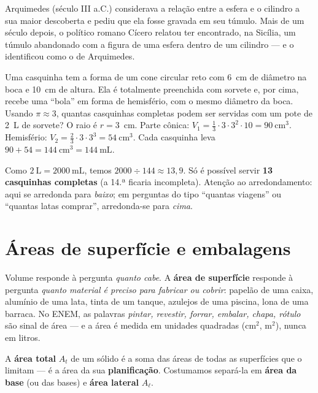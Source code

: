 \begin{contexto}
Arquimedes (século III a.C.) considerava a relação entre a esfera e o cilindro a
sua maior descoberta e pediu que ela fosse gravada em seu túmulo. Mais de um
século depois, o político romano Cícero relatou ter encontrado, na Sicília, um
túmulo abandonado com a figura de uma esfera dentro de um cilindro — e o
identificou como o de Arquimedes.
\end{contexto}

\begin{exemplo}
Uma casquinha tem a forma de um cone circular reto com 6~cm de diâmetro na boca
e 10~cm de altura. Ela é totalmente preenchida com sorvete e, por cima, recebe uma
“bola” em forma de hemisfério, com o mesmo diâmetro da boca. Usando
$\pi\approx 3$, quantas casquinhas completas podem ser servidas com um pote de
2~L de sorvete?
\solucao
O raio é $r = 3$~cm. Parte cônica:
$V_1 = \frac13\cdot 3\cdot 3^2\cdot 10 = 90\ \text{cm}^3$.
Hemisfério: $V_2 = \frac23\cdot 3\cdot 3^3 = 54\ \text{cm}^3$.
Cada casquinha leva $90 + 54 = 144\ \text{cm}^3 = 144\ \text{mL}$.

Como $2\ \text{L} = 2000\ \text{mL}$, temos $2000\div 144 \approx 13{,}9$. Só é
possível servir \textbf{13 casquinhas completas} (a 14.ª ficaria incompleta).
Atenção ao arredondamento: aqui se arredonda para \emph{baixo}; em perguntas do
tipo “quantas viagens” ou “quantas latas comprar”, arredonda-se para \emph{cima}.
\end{exemplo}

\section{Áreas de superfície e embalagens}

Volume responde à pergunta \emph{quanto cabe}. A \textbf{área de superfície}
responde à pergunta \emph{quanto material é preciso para fabricar ou cobrir}:
papelão de uma caixa, alumínio de uma lata, tinta de um tanque, azulejos de uma
piscina, lona de uma barraca. No ENEM, as palavras \emph{pintar, revestir,
forrar, embalar, chapa, rótulo} são sinal de área — e a área é medida em
unidades quadradas (cm$^2$, m$^2$), nunca em litros.

\begin{definicao}
A \textbf{área total} $A_t$ de um sólido é a soma das áreas de todas as
superfícies que o limitam — é a área da sua \textbf{planificação}. Costumamos
separá-la em \textbf{área da base} (ou das bases) e \textbf{área lateral} $A_\ell$.
\end{definicao}

